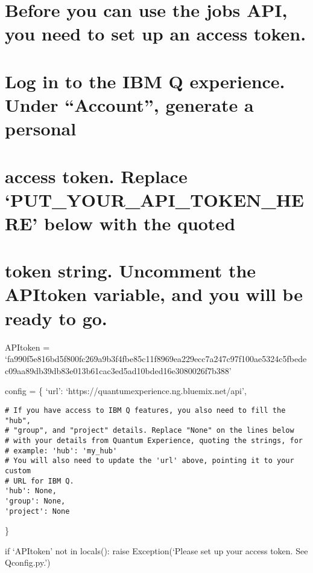 \documentclass[
]{article}
\date{}
\begin{document}
\hypertarget{before-you-can-use-the-jobs-api-you-need-to-set-up-an-access-token.}{%
\section{Before you can use the jobs API, you need to set up an access
token.}\label{before-you-can-use-the-jobs-api-you-need-to-set-up-an-access-token.}}

\hypertarget{log-in-to-the-ibm-q-experience.-under-account-generate-a-personal}{%
\section{Log in to the IBM Q experience. Under ``Account'', generate a
personal}\label{log-in-to-the-ibm-q-experience.-under-account-generate-a-personal}}

\hypertarget{access-token.-replace-put_your_api_token_here-below-with-the-quoted}{%
\section{access token. Replace `PUT\_YOUR\_API\_TOKEN\_HERE' below with
the
quoted}\label{access-token.-replace-put_your_api_token_here-below-with-the-quoted}}

\hypertarget{token-string.-uncomment-the-apitoken-variable-and-you-will-be-ready-to-go.}{%
\section{token string. Uncomment the APItoken variable, and you will be
ready to
go.}\label{token-string.-uncomment-the-apitoken-variable-and-you-will-be-ready-to-go.}}

APItoken =
`fa990f5e816bd5f800fc269a9b3f4fbe85c11f8969ea229ecc7a247c97f100ae5324c5fbedec09aa89db39db83e013b61cac3ed5ad10bded16e3080026f7b388'

config = \{ `url': `https://quantumexperience.ng.bluemix.net/api',

\begin{verbatim}
# If you have access to IBM Q features, you also need to fill the "hub",
# "group", and "project" details. Replace "None" on the lines below
# with your details from Quantum Experience, quoting the strings, for
# example: 'hub': 'my_hub'
# You will also need to update the 'url' above, pointing it to your custom
# URL for IBM Q.
'hub': None,
'group': None,
'project': None
\end{verbatim}

\}

if `APItoken' not in locals(): raise Exception(`Please set up your
access token. See Qconfig.py.')
\end{document}
